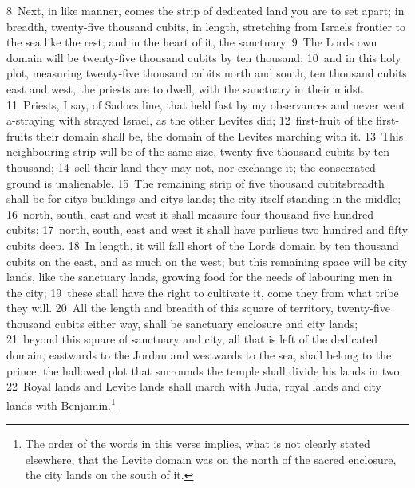 \documentclass[10pt]{book} %
\begin{document}
\textcolor{benred8}{8}~Next, in like manner, comes the strip of dedicated land you are to set apart; in breadth, twenty-five thousand cubits, in length, stretching from Israel\textquotesingle s frontier to the sea like the rest; and in the heart of it, the sanctuary. \textcolor{benred8}{9}~The Lord\textquotesingle s own domain will be twenty-five thousand cubits by ten thousand; \textcolor{benred8}{10}~and in this holy plot, measuring twenty-five thousand cubits north and south, ten thousand cubits east and west, the priests are to dwell, with the sanctuary in their midst. \textcolor{benred8}{11}~Priests, I say, of Sadoc\textquotesingle s line, that held fast by my observances and never went a-straying with strayed Israel, as the other Levites did; \textcolor{benred8}{12}~first-fruit of the first-fruits their domain shall be, the domain of the Levites marching with it. \textcolor{benred8}{13}~This neighbouring strip will be of the same size, twenty-five thousand cubits by ten thousand; \textcolor{benred8}{14}~sell their land they may not, nor exchange it; the consecrated ground is unalienable. \textcolor{benred8}{15}~The remaining strip of five thousand cubits\textquotesingle  breadth shall be for city\textquotesingle s buildings and city\textquotesingle s lands; the city itself standing in the middle; \textcolor{benred8}{16}~north, south, east and west it shall measure four thousand five hundred cubits; \textcolor{benred8}{17}~north, south, east and west it shall have purlieus two hundred and fifty cubits deep. \textcolor{benred8}{18}~In length, it will fall short of the Lord\textquotesingle s domain by ten thousand cubits on the east, and as much on the west; but this remaining space will be city lands, like the sanctuary lands, growing food for the needs of labouring men in the city; \textcolor{benred8}{19}~these shall have the right to cultivate it, come they from what tribe they will. \textcolor{benred8}{20}~All the length and breadth of this square of territory, twenty-five thousand cubits either way, shall be sanctuary enclosure and city lands; \textcolor{benred8}{21}~beyond this square of sanctuary and city, all that is left of the dedicated domain, eastwards to the Jordan and westwards to the sea, shall belong to the prince; the hallowed plot that surrounds the temple shall divide his lands in two. \textcolor{benred8}{22}~Royal lands and Levite lands shall march with Juda, royal lands and city lands with Benjamin.\footnote[2]{The order of the words in this verse implies, what is not clearly stated elsewhere, that the Levite domain was on the north of the sacred enclosure, the city lands on the south of it.}
\end{document}
